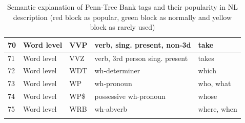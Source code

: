 \begin{longtable}{|p{}|p{}|p{}|p{}|p{}|}
		\rowcolor[HTML]{9AFF99} 
		70                                                        & Word level                                                  & VVP                                                        & verb, sing. present, non-3d                                                                                     & take                                                                            \\ \hline
		\rowcolor[HTML]{9AFF99} 
		71                                                        & Word level                                                  & VVZ                                                        & verb, 3rd person sing. present                                                                                  & takes                                                                           \\ \hline
		\rowcolor[HTML]{9AFF99} 
		72                                                        & Word level                                                  & WDT                                                        & wh-determiner                                                                                                   & which                                                                           \\ \hline
		\rowcolor[HTML]{9AFF99} 
		73                                                        & Word level                                                  & WP                                                         & wh-pronoun                                                                                                      & who, what                                                                       \\ \hline
		\rowcolor[HTML]{9AFF99} 
		74                                                        & Word level                                                  & WP\$                                                       & possessive wh-pronoun                                                                                           & whose                                                                           \\ \hline
		\rowcolor[HTML]{9AFF99} 
		75                                                        & Word level                                                  & WRB                                                        & wh-abverb                                                                                                       & where, when                                                                     \\ \hline
        
        \caption[Semantic explanation of Penn-Tree Bank tags]{Semantic explanation of Penn-Tree Bank tags and  their popularity in NL description (red block as popular, green block as normally and yellow block as rarely used)}
       \label{table:SummarizeAllTags} 
\end{longtable}

